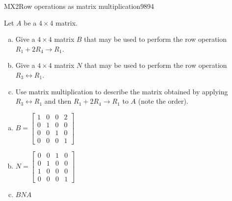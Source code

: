 \begin{exercise}{MX2}{Row operations as matrix multiplication}{9894} 
\begin{exerciseStatement} 

Let \(A\) be a \(4 \times 4\) matrix.

 

\begin{enumerate}[(a)]
\item Give a \(4 \times 4\) matrix \(B\) that may be used to perform the row operation \(R_1 + 2 R_4 \to R_1\).
\item Give a \(4 \times 4\) matrix \(N\) that may be used to perform the row operation \(R_3 \leftrightarrow R_1\).
\item Use matrix multiplication to describe the matrix obtained by applying \(R_3 \leftrightarrow R_1\) and then \(R_1 + 2 R_4 \to R_1\) to \(A\) (note the order). 
\end{enumerate}

     \end{exerciseStatement}
 \begin{exerciseAnswer} 

\begin{enumerate}[(a)]
\item \(B=\left[\begin{array}{cccc}
1 & 0 & 0 & 2 \\
0 & 1 & 0 & 0 \\
0 & 0 & 1 & 0 \\
0 & 0 & 0 & 1
\end{array}\right]\)
\item \(N=\left[\begin{array}{cccc}
0 & 0 & 1 & 0 \\
0 & 1 & 0 & 0 \\
1 & 0 & 0 & 0 \\
0 & 0 & 0 & 1
\end{array}\right]\)
\item  \(BNA\) 
\end{enumerate}

     \end{exerciseAnswer}
 \end{exercise}


